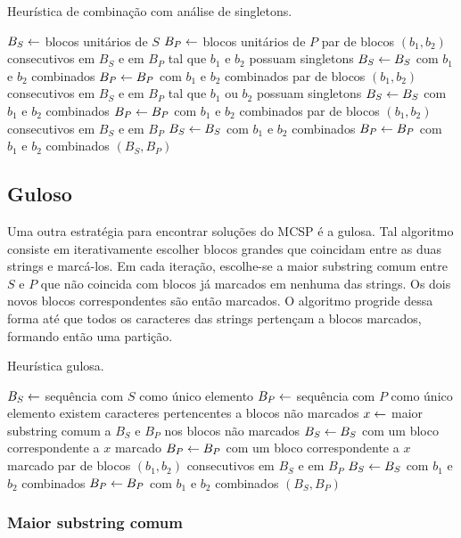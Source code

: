         \begin{algorithm}
        \caption{Heurística de combinação com análise de singletons.} \label{alg:combineS}
        \begin{codebox}
        \li $B_S \leftarrow$ blocos unitários de $S$
        \li $B_P \leftarrow$ blocos unitários de $P$
        \li \Para \Cada par de blocos $(b_1, b_2)$ consecutivos em $B_S$ e em $B_P$
        \zi tal que $b_1$ e $b_2$ possuam singletons \Faca
            \Do
        \li     $B_S \leftarrow B_S$ com $b_1$ e $b_2$ combinados
        \li     $B_P \leftarrow B_P$ com $b_1$ e $b_2$ combinados
            \End
        \li \Para \Cada par de blocos $(b_1, b_2)$ consecutivos em $B_S$ e em $B_P$
        \zi tal que $b_1$ ou $b_2$ possuam singletons \Faca
            \Do
        \li     $B_S \leftarrow B_S$ com $b_1$ e $b_2$ combinados
        \li     $B_P \leftarrow B_P$ com $b_1$ e $b_2$ combinados
            \End
        \li \Para \Cada par de blocos $(b_1, b_2)$ consecutivos em $B_S$ e em $B_P$ \Faca
            \Do
        \li     $B_S \leftarrow B_S$ com $b_1$ e $b_2$ combinados
        \li     $B_P \leftarrow B_P$ com $b_1$ e $b_2$ combinados
            \End
        \li \Devolva $(B_S, B_P)$
        \end{codebox}
    \end{algorithm}

\subsection{Guloso}

    Uma outra estratégia para encontrar soluções do MCSP é a gulosa. Tal algoritmo consiste em iterativamente escolher blocos grandes que coincidam entre as duas strings e marcá-los. Em cada iteração, escolhe-se a maior substring comum entre $S$ e $P$ que não coincida com blocos já marcados em nenhuma das strings. Os dois novos blocos correspondentes são então marcados. O algoritmo progride dessa forma até que todos os caracteres das strings pertençam a blocos marcados, formando então uma partição.

    \begin{algorithm}
        \caption{Heurística gulosa.} \label{alg:greedy}
        \begin{codebox}
        \li $B_S \leftarrow$ sequência com $S$ como único elemento
        \li $B_P \leftarrow$ sequência com $P$ como único elemento
        \li \Enquanto existem caracteres pertencentes a blocos não marcados \Faca
            \Do
        \li     $x \leftarrow$ maior substring comum a $B_S$ e $B_P$ nos blocos não marcados
        \li     $B_S \leftarrow B_S$ com um bloco correspondente a $x$ marcado
        \li     $B_P \leftarrow B_P$ com um bloco correspondente a $x$ marcado
            \End
        \li \Para \Cada par de blocos $(b_1, b_2)$ consecutivos em $B_S$ e em $B_P$ \Faca
            \Do
        \li     $B_S \leftarrow B_S$ com $b_1$ e $b_2$ combinados
        \li     $B_P \leftarrow B_P$ com $b_1$ e $b_2$ combinados
            \End
        \li \Devolva $(B_S, B_P)$
        \end{codebox}
    \end{algorithm}

    \subsubsection{Maior substring comum}


